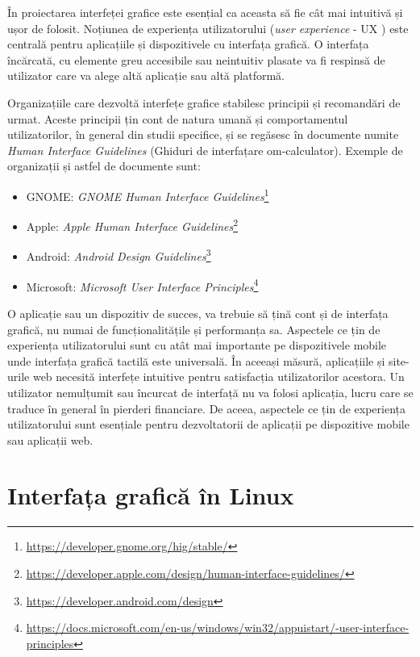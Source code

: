 În proiectarea interfeței grafice este esențial ca aceasta să fie cât mai intuitivă și ușor de folosit.
Noțiunea de experiența utilizatorului (\textit{user experience} - UX ) este centrală pentru aplicațiile și dispozitivele cu interfața grafică.
O interfața încărcată, cu elemente greu accesibile sau neintuitiv plasate va fi respinsă de utilizator care va alege altă aplicație sau altă platformă.

Organizațiile care dezvoltă interfețe grafice stabilesc principii și recomandări de urmat.
Aceste principii țin cont de natura umană și comportamentul utilizatorilor, în general din studii specifice, și se regăsesc în documente numite \textit{Human Interface Guidelines}  (Ghiduri de interfațare om-calculator).
Exemple de organizații și astfel de documente sunt:

\begin{itemize}
  \item GNOME: \textit{GNOME Human Interface Guidelines}\footnote{\url{https://developer.gnome.org/hig/stable/}}
  \item Apple: \textit{Apple Human Interface Guidelines}\footnote{\url{https://developer.apple.com/design/human-interface-guidelines/}}
  \item Android: \textit{Android Design Guidelines}\footnote{\url{https://developer.android.com/design}}
  \item Microsoft: \textit{Microsoft User Interface Principles}\footnote{\url{https://docs.microsoft.com/en-us/windows/win32/appuistart/-user-interface-principles}}
\end{itemize}

O aplicație sau un dispozitiv de succes, va trebuie să țină cont și de interfața grafică, nu numai de funcționalitățile și performanța sa.
Aspectele ce țin de experiența utilizatorului sunt cu atât mai importante pe dispozitivele mobile unde interfața grafică tactilă este universală.
În aceeași măsură, aplicațiile și site-urile web necesită interfețe intuitive pentru satisfacția utilizatorilor acestora.
Un utilizator nemulțumit sau încurcat de interfață nu va folosi aplicația, lucru care se traduce în general în pierderi financiare.
De aceea, aspectele ce țin de experiența utilizatorului sunt esențiale pentru dezvoltatorii de aplicații pe dispozitive mobile sau aplicații web.

\section{Interfața grafică în Linux}
\label{sec:ui:linux-gui}

